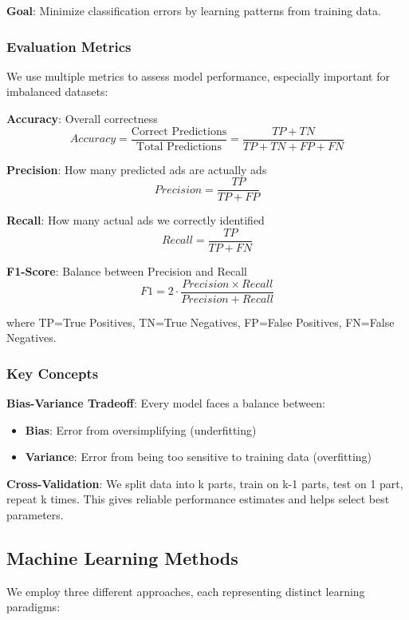 \textbf{Goal}: Minimize classification errors by learning patterns from training data.

\subsubsection{Evaluation Metrics}
We use multiple metrics to assess model performance, especially important for imbalanced datasets:

\textbf{Accuracy}: Overall correctness
\begin{equation}
Accuracy = \frac{\text{Correct Predictions}}{\text{Total Predictions}} = \frac{TP + TN}{TP + TN + FP + FN}
\end{equation}

\textbf{Precision}: How many predicted ads are actually ads
\begin{equation}
Precision = \frac{TP}{TP + FP}
\end{equation}

\textbf{Recall}: How many actual ads we correctly identified
\begin{equation}
Recall = \frac{TP}{TP + FN}
\end{equation}

\textbf{F1-Score}: Balance between Precision and Recall
\begin{equation}
F1 = 2 \cdot \frac{Precision \times Recall}{Precision + Recall}
\end{equation}

where TP=True Positives, TN=True Negatives, FP=False Positives, FN=False Negatives.

\subsubsection{Key Concepts}
\textbf{Bias-Variance Tradeoff}: Every model faces a balance between:
\begin{itemize}
    \item \textbf{Bias}: Error from oversimplifying (underfitting)
    \item \textbf{Variance}: Error from being too sensitive to training data (overfitting)
\end{itemize}

\textbf{Cross-Validation}: We split data into k parts, train on k-1 parts, test on 1 part, repeat k times. This gives reliable performance estimates and helps select best parameters.

\subsection{Machine Learning Methods}
We employ three different approaches, each representing distinct learning paradigms:

